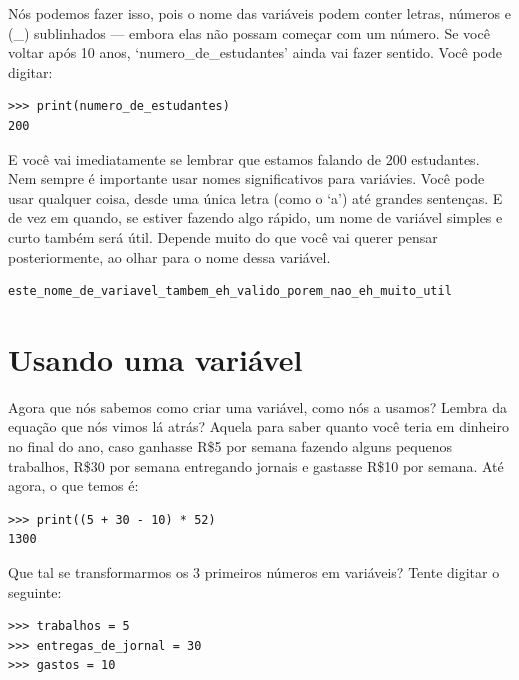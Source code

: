 Nós podemos fazer isso, pois o nome das variáveis podem conter letras, números e (\_) sublinhados --- embora elas não possam começar com um número. Se você voltar após 10 anos, `numero\_de\_estudantes' ainda vai fazer sentido. Você pode digitar:

\begin{listing}
\begin{verbatim}
>>> print(numero_de_estudantes)
200
\end{verbatim}
\end{listing}

\noindent
E você vai imediatamente se lembrar que estamos falando de 200 estudantes. Nem sempre é importante usar nomes significativos para variávies. Você pode usar qualquer coisa, desde uma única letra (como o `a') até grandes sentenças. E de vez em quando, se estiver fazendo algo rápido, um nome de variável simples e curto também será útil. Depende muito do que você vai querer pensar posteriormente, ao olhar para o nome dessa variável.

\begin{listing}
\begin{verbatim}
este_nome_de_variavel_tambem_eh_valido_porem_nao_eh_muito_util
\end{verbatim}
\end{listing}

\section{Usando uma variável}

Agora que nós sabemos como criar uma variável, como nós a usamos? Lembra da equação que nós vimos lá atrás? Aquela para saber quanto você teria em dinheiro no final do ano, caso ganhasse R\$5 por semana fazendo alguns pequenos trabalhos, R\$30 por semana entregando jornais e gastasse R\$10 por semana. Até agora, o que temos é:

\begin{listing}
\begin{verbatim}
>>> print((5 + 30 - 10) * 52)
1300
\end{verbatim}
\end{listing}

\noindent
Que tal se transformarmos os 3 primeiros números em variáveis? Tente digitar o seguinte:

\begin{listing}
\begin{verbatim}
>>> trabalhos = 5
>>> entregas_de_jornal = 30
>>> gastos = 10
\end{verbatim}
\end{listing}

